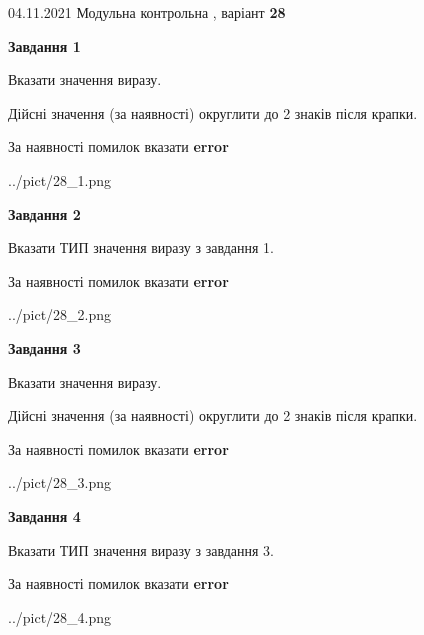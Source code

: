 \documentclass[11pt, ukrainian]{article}
\begin{document}
{04.11.2021 Модульна контрольна , варіант  \No \textbf { 28 }\par}
{
\begin {large}
{\begin {center}\textbf{Завдання 1}\end {center}}\par
Вказати значення виразу. \par
Дійсні значення (за наявності) округлити до 2 знаків після крапки. \par
За наявності помилок вказати \textbf{error}

\begin{center}
	{../pict/28_1.png}
\end{center}
\newpage

{\begin {center}\textbf{Завдання 2}\end {center}}\par
Вказати ТИП значення виразу з завдання 1. \par
За наявності помилок вказати \textbf{error}

\begin{center}
	{../pict/28_2.png}
\end{center}
\newpage

{\begin {center}\textbf{Завдання 3}\end {center}}\par
Вказати значення виразу. \par
Дійсні значення (за наявності) округлити до 2 знаків після крапки. \par
За наявності помилок вказати \textbf{error}

\begin{center}
	{../pict/28_3.png}
\end{center}
\newpage

{\begin {center}\textbf{Завдання 4}\end {center}}\par
Вказати ТИП значення виразу з завдання 3. \par
За наявності помилок вказати \textbf{error}

\begin{center}
	{../pict/28_4.png}
\end{center}
\newpage


\end{large}}
\end{document}
